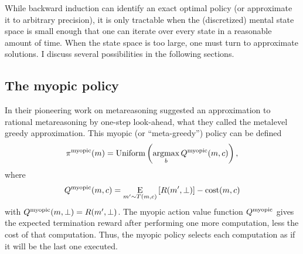 


While backward induction can identify an exact optimal policy (or approximate it to arbitrary precision), it is only tractable when the (discretized) mental state space is small enough that one can iterate over every state in a reasonable amount of time. When the state space is too large, one must turn to approximate solutions. I discuss several possibilities in the following sections.

\subsection{The myopic policy}\label{sec:myopic}

In their pioneering work on metareasoning \citet{russell1991principles} suggested an approximation to rational metareasoning by one-step look-ahead, what they called the metalevel greedy approximation. This myopic (or ``meta-greedy'') policy can be defined
\begin{equation}
  \pi^{\mathrm{myopic}}(m) = \mathrm{Uniform}\left(\operatorname*{argmax}_b Q^{\mathrm{myopic}}(m, c)\right),
\end{equation}
where
\begin{equation}\label{eq:Q-myopic}
Q^{\mathrm{myopic}}(m, c) = \operatorname*{E}_{m' \sim T(m, c)}\left[ 
  R(m', \bot)
\right] - \text{cost}(m, c)
\end{equation}
with $Q^{\mathrm{myopic}}(m, \bot) = R(m', \bot)$. The myopic action value function $Q^{\mathrm{myopic}}$ gives the expected termination reward after performing one more computation, less the cost of that computation. Thus, the myopic policy selects each computation as if it will be the last one executed.

